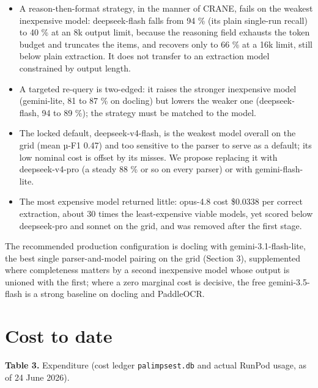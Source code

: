\begin{itemize}
\tightlist
\item
  A reason-then-format strategy, in the manner of CRANE, fails on the
  weakest inexpensive model: deepseek-flash falls from 94 \% (its plain
  single-run recall) to 40 \% at an 8k output limit, because the
  reasoning field exhausts the token budget and truncates the items, and
  recovers only to 66 \% at a 16k limit, still below plain extraction. It
  does not transfer to an extraction model constrained by output length.
\item
  A targeted re-query is two-edged: it raises the stronger inexpensive
  model (gemini-lite, 81 to 87 \% on docling) but lowers the weaker one
  (deepseek-flash, 94 to 89 \%); the strategy must be matched to the
  model.
\item
  The locked default, deepseek-v4-flash, is the weakest model overall on
  the grid (mean µ-F1 0.47) and too sensitive to the parser to serve as a
  default; its low nominal cost is offset by its misses. We propose
  replacing it with deepseek-v4-pro (a steady 88 \% or so on every
  parser) or with gemini-flash-lite.
\item
  The most expensive model returned little: opus-4.8 cost \$0.0338 per
  correct extraction, about 30 times the least-expensive viable models,
  yet scored below deepseek-pro and sonnet on the grid, and was removed
  after the first stage.
\end{itemize}

The recommended production configuration is docling with
gemini-3.1-flash-lite, the best single parser-and-model pairing on the
grid (Section 3), supplemented where completeness matters by a second
inexpensive model whose output is unioned with the first; where a zero
marginal cost is decisive, the free gemini-3.5-flash is a strong baseline
on docling and PaddleOCR.

\section{Cost to date}\label{cost-to-date}

\textbf{Table 3.} Expenditure (cost ledger \texttt{palimpsest.db} and
actual RunPod usage, as of 24 June 2026).

